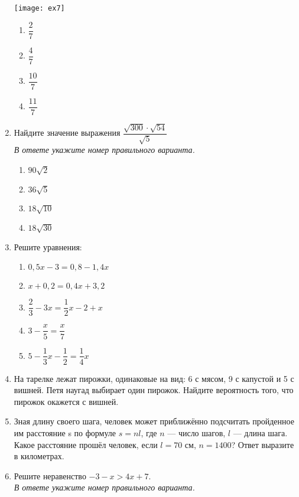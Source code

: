\documentclass[12pt, a4paper]{article}
\begin{document}
\begin{enumerate}
\begin{center}
			\texttt{[image: ex7]}
		\end{center}
		\begin{multicols}{4}
			\begin{enumerate}[label=\arabic*)]
				\item $\dfrac{2}{7}$
				\item $\dfrac{4}{7}$
				\item $\dfrac{10}{7}$
				\item $\dfrac{11}{7}$
			\end{enumerate}
		\end{multicols}
		\item Найдите значение выражения $\dfrac{\sqrt{300}\cdot\sqrt{54}}{\sqrt{5}}$\\
		\textit{В ответе укажите номер правильного варианта.}
		\begin{multicols}{4}
			\begin{enumerate}[label=\arabic*)]
				\item $90\sqrt{2}$
				\item $36\sqrt{5}$
				\item $18\sqrt{10}$
				\item $18\sqrt{30}$
			\end{enumerate}
		\end{multicols}
		\item Решите уравнения:
		\begin{multicols}{2}
			\begin{enumerate}[label=\arabic*)]
				\item $0,5x-3=0,8-1,4x$
				\item $x+0,2=0,4x+3,2$
				\item $\dfrac{2}{3}-3x=\dfrac{1}{2}x-2+x$
				\item $3-\dfrac{x}{5}=\dfrac{x}{7}$
				\item $5-\dfrac{1}{3}x-\dfrac{1}{2}=\dfrac{1}{4}x$
			\end{enumerate}
		\end{multicols}
		\item На тарелке лежат пирожки, одинаковые на вид: 6 с мясом, 9 с капустой и 5 с вишней. Петя наугад
		выбирает один пирожок. Найдите вероятность того, что пирожок окажется с вишней.
		\item Зная длину своего шага, человек может приближённо подсчитать пройденное им расстояние s по
		формуле $s=nl$, где $n$ --- число шагов, $l$ --- длина шага. Какое расстояние прошёл человек, если $l=70$ см, $n=1400$? Ответ выразите в километрах.
		\item Решите неравенство $-3-x>4x+7$.\\ \textit{В ответе укажите номер правильного варианта.}

\end{enumerate}
\end{document}
